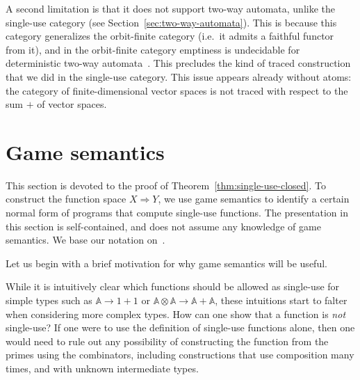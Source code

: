 \documentclass[10pt,a4paper]{amsart}
\numberwithin{equation}{section}
\theoremstyle{plain}
\newcommand{\atoms}{\mathbb A}
\begin{document}
A second limitation is that it does not support two-way automata, unlike the single-use category (see Section~\ref{sec:two-way-automata}). This is because this category generalizes the orbit-finite category (i.e.~it admits a faithful functor from it), and in the orbit-finite category emptiness is undecidable for deterministic two-way automata~\cite[Theorem 5.3]{nevenFiniteStateMachines2004}. This precludes the kind of traced construction that we did in the single-use category. This issue appears already without atoms: the category of finite-dimensional vector spaces is not traced with respect to the sum $+$ of vector spaces. 




\appendix

\newcommand{\invar}[1]{#1_{\mathrm{in}}}
\newcommand{\outvar}[1]{#1_{\mathrm{out}}}

\section{Game semantics}
\label{sec:game-semantics}

This section is devoted to the proof of Theorem~\ref{thm:single-use-closed}. To construct the function space $X \Rightarrow Y$, we use game semantics to identify a certain normal form of programs that compute single-use functions. The presentation in this section is self-contained, and does not assume any knowledge of game semantics. We base our notation on~\cite{abramsky2013semantics}.

Let us begin with a brief motivation for why game semantics will be useful.

While it is intuitively clear which functions should be allowed as single-use for simple types such as $\atoms \to 1+1$ or $\atoms \otimes \atoms \to \atoms + \atoms$, these intuitions start to falter when considering more complex types. How can one show that a function is \emph{not} single-use? If one were to use the definition of single-use functions alone, then one would need to rule out any possibility of constructing the function from the primes using the combinators, including constructions that use composition many times, and with unknown intermediate types. 
\end{document}
